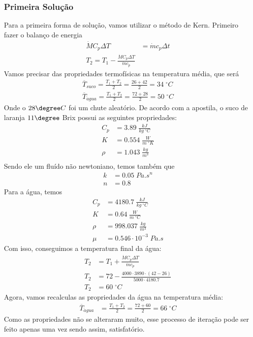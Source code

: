 \subsubsection{Primeira Solução}
Para a primeira forma de solução, vamos utilizar o método de Kern. Primeiro fazer o balanço de
energia
\begin{align}
    \dot{M}C_{p} \Delta T &= \dot{m}  c_p \Delta t \\
    T_2 = T_1 - \frac{\dot{M} C_p \Delta T}{\dot{m}c_{p}}
\end{align}
Vamos precisar das propriedades termofísicas na temperatura média, que será
\begin{align}
    \overline{T}_{suco} = \frac{T_1 + T_2}{2} = \frac{26 + 42}{2} = 34 \; ^{\circ}C \\
    \overline{T}_{\acute{a}gua} = \frac{T_1 + T_2}{2} = \frac{72 + 28}{2} = 50 \; ^{\circ}C
\end{align}
Onde o \(28\degree C\) foi um chute aleatório. De acordo com a apostila, o suco de laranja \(11
\degree \) Brix possui as seguintes propriedades:
\begin{align}
    C_{p} &= 3.89 \; \frac{kJ}{kg \; ^{\circ}C} \\
    K &= 0.554 \; \frac{W}{m \; ^{\circ}K}\\
    \rho &= 1.043 \; \frac{kg}{m^{3}} \\  
\end{align}
Sendo ele um fluído não newtoniano, temos também que
\begin{align}
    k &= 0.05 \; Pa.s^{n} \\
    n &= 0.8
\end{align}
Para a água, temos
\begin{align}
    C_{p} &= 4180.7 \; \frac{kJ}{kg \; ^{\circ}C} \\
    K &= 0.64 \; \frac{W}{m \; ^{\circ}C}\\
    \rho &= 998.037 \; \frac{kg}{m^{3}} \\
    \mu &= 0.546 \cdot 10^{-3} \; Pa.s
\end{align}
Com isso, conseguimos a temperatura final da água:
\begin{align}
    T_2 &= T_1 + \frac{\dot{M} C_p \Delta T}{\dot{m}c_{p}} \\
    T_2 &= 72 - \frac{4000 \cdot 3890 \cdot (42 - 26)}{5000 \cdot 4180.7} \\
    T_2 &= 60 \; ^{\circ}C
\end{align}
Agora, vamos recalculas as propriedades da água na temperatura média:
\begin{align}
    \overline{T}_{\acute{a}gua} &= \frac{T_1 + T_2}{2} = \frac{72 + 60}{2} = 66 \; ^{\circ}C 
\end{align}
Como as propriedades não se alteraram muito, esse processo de iteração pode ser feito apenas uma vez
sendo assim, satisfatório. \par

